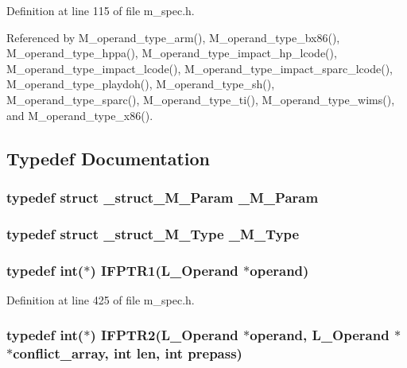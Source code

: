 Definition at line 115 of file m\_\-spec.h.

Referenced by M\_\-operand\_\-type\_\-arm(), M\_\-operand\_\-type\_\-bx86(), M\_\-operand\_\-type\_\-hppa(), M\_\-operand\_\-type\_\-impact\_\-hp\_\-lcode(), M\_\-operand\_\-type\_\-impact\_\-lcode(), M\_\-operand\_\-type\_\-impact\_\-sparc\_\-lcode(), M\_\-operand\_\-type\_\-playdoh(), M\_\-operand\_\-type\_\-sh(), M\_\-operand\_\-type\_\-sparc(), M\_\-operand\_\-type\_\-ti(), M\_\-operand\_\-type\_\-wims(), and M\_\-operand\_\-type\_\-x86().

\subsection{Typedef Documentation}
\subsubsection{\setlength{\rightskip}{0pt plus 5cm}typedef struct \bf{\_\-struct\_\-M\_\-Param}  \bf{\_\-M\_\-Param}}\label{m__spec_8h_0976d2e7a79bf6de0a550dccbe3d99d0}


\subsubsection{\setlength{\rightskip}{0pt plus 5cm}typedef struct \bf{\_\-struct\_\-M\_\-Type}
 \bf{\_\-M\_\-Type}}\label{m__spec_8h_1fb373c5c54ad0c5c52e28887f132915}


\subsubsection{\setlength{\rightskip}{0pt plus 5cm}typedef int($\ast$) \bf{IFPTR1}(L\_\-Operand $\ast$operand)}\label{m__spec_8h_dee9e145ce8d64f8f7319fae10c135b5}




Definition at line 425 of file m\_\-spec.h.
\subsubsection{\setlength{\rightskip}{0pt plus 5cm}typedef int($\ast$) \bf{IFPTR2}(L\_\-Operand $\ast$operand, L\_\-Operand $\ast$$\ast$conflict\_\-array, int len, int prepass)}\label{m__spec_8h_a58239e78624e0799d10bddeaf2e63f5}





